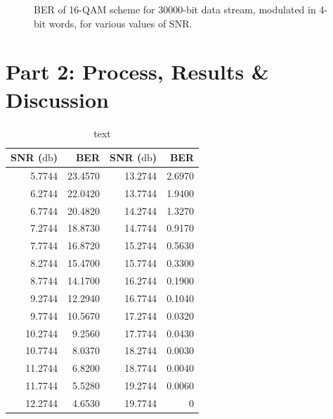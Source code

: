 \documentclass{article}
\begin{document}
\begin{figure}[H]
\begin{minipage}{6cm}
		\caption{BER of 16-QAM scheme for 30000-bit data stream, modulated in 4-bit words, for various values of SNR.}
	\end{minipage}
\end{figure}


\section{Part 2: Process, Results \& Discussion}

\begin{table}[H]
	\centering
	\caption{text}
	\begin{tabular}{rrrr}
		\toprule
		\textbf{SNR} ($\si{\decibel}$) & \textbf{BER} & \textbf{SNR} ($\si{\decibel}$) & \textbf{BER}\\
		\midrule
		5.7744	&   23.4570	&	13.2744 &   2.6970\\
		6.2744  & 	22.0420	&	13.7744 &   1.9400\\
		6.7744  & 	20.4820	&	14.2744 &   1.3270\\
		7.2744  & 	18.8730	&	14.7744 &   0.9170\\
		7.7744  & 	16.8720	&	15.2744 &   0.5630\\
		8.2744  & 	15.4700	&	15.7744 &   0.3300\\
		8.7744  & 	14.1700	&	16.2744 &   0.1900\\
		9.2744  & 	12.2940	&	16.7744 &   0.1040\\
		9.7744  & 	10.5670	&	17.2744 &   0.0320\\
		10.2744 &   9.2560	&	17.7744 &   0.0430\\
		10.7744 &   8.0370	&	18.2744 &   0.0030\\
		11.2744 &   6.8200	&	18.7744 &   0.0040\\
		11.7744 &   5.5280	&	19.2744 &   0.0060\\
		12.2744 &   4.6530	&	19.7744 &        0\\
		\bottomrule
	\end{tabular}
\end{table}
\end{document}
